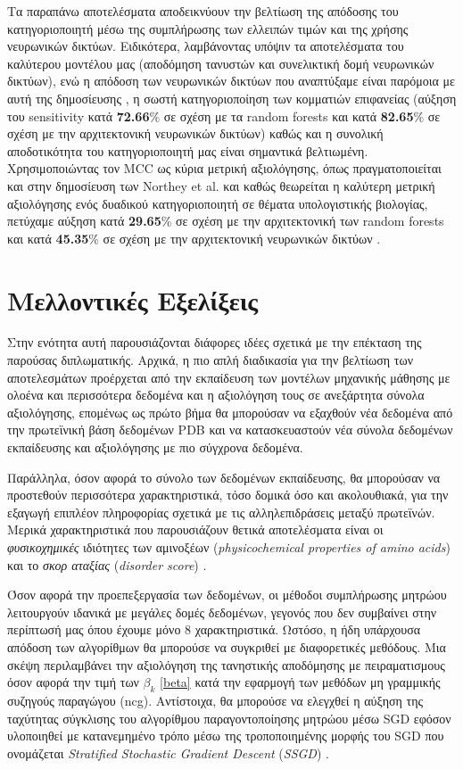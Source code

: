 \medskip
Τα παραπάνω αποτελέσματα αποδεικνύουν την βελτίωση της απόδοσης του κατηγοριοποιητή μέσω της συμπλήρωσης των ελλειπών τιμών και της χρήσης νευρωνικών δικτύων. Ειδικότερα, λαμβάνοντας υπόψιν τα αποτελέσματα του καλύτερου μοντέλου μας (αποδόμηση τανυστών και συνελικτική δομή νευρωνικών δικτύων), ενώ η απόδοση των νευρωνικών δικτύων που αναπτύξαμε είναι παρόμοια με αυτή της δημοσίευσης \cite{Northey2017}, η σωστή κατηγοριοποίηση των κομματιών επιφανείας (αύξηση του sensitivity κατά \textbf{72.66}$\%$ σε σχέση με τα random forests και κατά \textbf{82.65}$\%$ σε σχέση με την αρχιτεκτονική νευρωνικών δικτύων) καθώς και η συνολική αποδοτικότητα του κατηγοριοποιητή μας είναι σημαντικά βελτιωμένη. Χρησιμοποιώντας τον MCC ως κύρια μετρική αξιολόγησης, όπως πραγματοποιείται και στην δημοσίευση των Northey et al. και καθώς θεωρείται η καλύτερη μετρική αξιολόγησης ενός δυαδικού κατηγοριοποιητή σε θέματα υπολογιστικής βιολογίας, πετύχαμε αύξηση κατά \textbf{29.65}$\%$ σε σχέση με την αρχιτεκτονική των random forests και κατά \textbf{45.35}$\%$ σε σχέση με την αρχιτεκτονική νευρωνικών δικτύων \cite{Northey2017}. 

\newpage
\section{Μελλοντικές Εξελίξεις}

Στην ενότητα αυτή παρουσιάζονται διάφορες ιδέες σχετικά με την επέκταση της παρούσας διπλωματικής. Αρχικά, η πιο απλή διαδικασία για την βελτίωση των αποτελεσμάτων προέρχεται από την εκπαίδευση των μοντέλων μηχανικής μάθησης με ολοένα και περισσότερα δεδομένα και η αξιολόγηση τους σε ανεξάρτητα σύνολα αξιολόγησης, επομένως ως πρώτο βήμα θα μπορούσαν να εξαχθούν νέα δεδομένα από την πρωτεϊνική βάση δεδομένων PDB και να κατασκευαστούν νέα σύνολα δεδομένων εκπαίδευσης και αξιολόγησης με πιο σύγχρονα δεδομένα.

\medskip
Παράλληλα, όσον αφορά το σύνολο των δεδομένων εκπαίδευσης, θα μπορούσαν να προστεθούν περισσότερα χαρακτηριστικά, τόσο δομικά όσο και ακολουθιακά, για την εξαγωγή επιπλέον πληροφορίας σχετικά με τις αλληλεπιδράσεις μεταξύ πρωτεϊνών. Μερικά χαρακτηριστικά που παρουσιάζουν θετικά αποτελέσματα είναι οι \textit{φυσικοχημικές} ιδιότητες των αμινοξέων (\textit{physicochemical properties of amino acids}) \cite{Xie2020} και το \textit{σκορ αταξίας} (\textit{disorder score}) \cite{Li2012}.

\medskip
Όσον αφορά την προεπεξεργασία των δεδομένων, οι μέθοδοι συμπλήρωσης μητρώου λειτουργούν ιδανικά με μεγάλες δομές δεδομένων, γεγονός που δεν συμβαίνει στην περίπτωσή μας όπου έχουμε μόνο 8 χαρακτηριστικά. Ωστόσο, η ήδη υπάρχουσα απόδοση των αλγορίθμων θα μπορούσε να συγκριθεί με διαφορετικές μεθόδους. Μια σκέψη περιλαμβάνει την αξιολόγηση της τανηστικής αποδόμησης με πειραματισμους όσον αφορά την τιμή των $\beta_k$ \ref{beta} κατά την εφαρμογή των μεθόδων μη γραμμικής συζηγούς παραγώγου (ncg). Αντίστοιχα, θα μπορούσε να ελεγχθεί η αύξηση της ταχύτητας σύγκλισης του αλγορίθμου παραγοντοποίησης μητρώου μέσω SGD εφόσον υλοποιηθεί με κατανεμημένο τρόπο μέσω της τροποποιημένης μορφής του SGD που ονομάζεται \textit{Stratified Stochastic Gradient Descent} (\textit{SSGD}) \cite{Gemulla2011}.